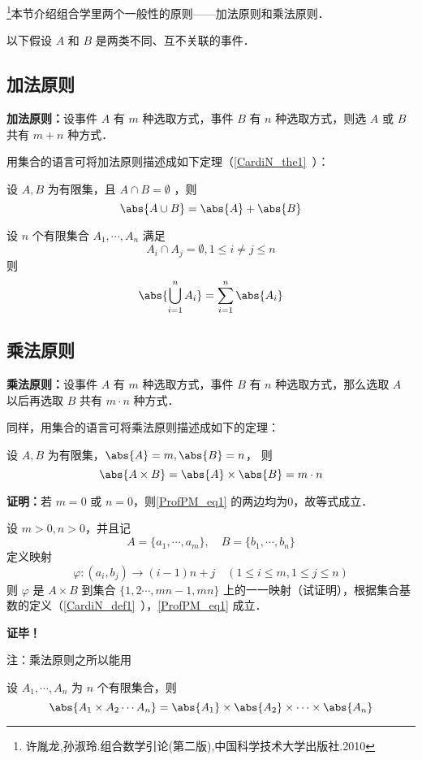 
\footnote{许胤龙,孙淑玲.组合数学引论(第二版),中国科学技术大学出版社.2010}本节介绍组合学里两个一般性的原则——加法原则和乘法原则．

以下假设 $A$ 和 $B$ 是两类不同、互不关联的事件．
\subsection{加法原则}
\textbf{加法原则：}设事件 $A$ 有 $m$ 种选取方式，事件 $B$ 有 $n$ 种选取方式，则选 $A$ 或 $B$ 共有 $m+n$ 种方式．

用集合的语言可将加法原则描述成如下定理（\autoref{CardiN_the1}~）：
\begin{theorem}{}
设 $A,B$ 为有限集，且 $A\cap B=\emptyset$ ，则
\begin{equation}
\abs{A\cup B}=\abs{A}+\abs{B}
\end{equation}
\end{theorem}
\begin{corollary}{}
设 $n$ 个有限集合 $A_1,\cdots,A_n$ 满足
\begin{equation}
A_i\cap A_j=\emptyset,1\leq i\neq j\leq n
\end{equation}
则
\begin{equation}
\abs{\bigcup_{i=1}^n A_i}=\sum_{i=1}^n\abs{A_i}
\end{equation}

\end{corollary}
\subsection{乘法原则}
\textbf{乘法原则：}设事件 $A$ 有 $m$ 种选取方式，事件 $B$ 有 $n$ 种选取方式，那么选取 $A$ 以后再选取 $B$ 共有 $m\cdot n$ 种方式．

同样，用集合的语言可将乘法原则描述成如下的定理：
\begin{theorem}{}\label{ProfPM_the1}
设 $A,B$ 为有限集，$\abs{A}=m,\abs{B}=n$， 则
\begin{equation}\label{ProfPM_eq1}
\abs{A\times B}=\abs{A}\times\abs{B}=m\cdot n
\end{equation}
\end{theorem}
\textbf{证明：}若 $m=0$ 或 $n=0$，则\autoref{ProfPM_eq1} 的两边均为0，故等式成立．

设 $m>0,n>0$，并且记
\begin{equation}
A=\{a_1,\cdots,a_m\},\quad B=\{b_1,\cdots,b_n\}
\end{equation}
定义映射
\begin{equation}
\varphi:(a_i,b_j)\rightarrow (i-1)n+j\quad (1\leq i\leq m,1\leq j\leq n)
\end{equation}
则 $\varphi$ 是 $A\times B$ 到集合 $\{1,2\cdots,mn-1,mn\}$ 上的一一映射（试证明），根据集合基数的定义（\autoref{CardiN_def1}~），\autoref{ProfPM_eq1} 成立．

\textbf{证毕！}

注：乘法原则之所以能用
\begin{corollary}{}
设 $A_1,\cdots,A_n$ 为 $n$ 个有限集合，则
\begin{equation}
\abs{A_1\times A_2\cdots A_n}=\abs{A_1}\times\abs{A_2}\times\cdots\times\abs{A_n}
\end{equation}

\end{corollary}